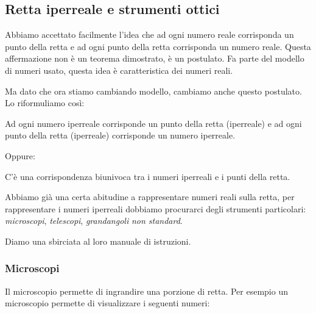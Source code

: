 
\subsection{Retta iperreale e strumenti ottici}
\label{subsec:insnum_retta}

Abbiamo accettato facilmente l'idea che 
ad ogni numero reale corrisponda un punto della retta e ad ogni 
punto della retta corrisponda un numero reale. 
Questa affermazione non è un teorema dimostrato, è un postulato. 
Fa parte del modello di numeri usato, questa idea è caratteristica dei 
numeri reali. 

Ma dato che ora stiamo cambiando modello, cambiamo anche questo postulato. 
Lo riformuliamo così:

\begin{postulato}
Ad ogni numero iperreale corrisponde un punto della retta (iperreale) e ad 
ogni punto della retta (iperreale) corrisponde un numero iperreale.
\end{postulato}

Oppure:

\begin{postulato}
C'è una corrispondenza biunivoca tra i numeri iperreali e 
i punti della retta.
\end{postulato}

Abbiamo già una certa abitudine a rappresentare numeri reali sulla retta, 
per rappresentare i numeri iperreali dobbiamo procurarci degli strumenti 
particolari: \emph{microscopi}, \emph{telescopi}, \emph{grandangoli} 
\emph{non standard}.

Diamo una sbirciata al loro manuale di istruzioni.

\newpage %

\subsubsection{Microscopi}
\label{subsec:insnum_microscopio}

Il microscopio permette di ingrandire una porzione di retta. 
Per esempio un microscopio permette di visualizzare i seguenti numeri:


